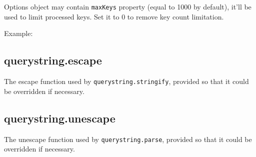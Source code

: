 Options object may contain \texttt{maxKeys} property (equal to 1000 by
default), it'll be used to limit processed keys. Set it to 0 to remove
key count limitation.

Example:

\begin{Shaded}
\begin{Highlighting}[]
\NormalTok{(}\NormalTok{)}
\NormalTok{\{ }\NormalTok{: }\NormalTok{, }\NormalTok{: [}\NormalTok{, }\NormalTok{], }\NormalTok{: } \NormalTok{\}}
\end{Highlighting}
\end{Shaded}

\subsection{querystring.escape}\label{querystring.escape}

The escape function used by \texttt{querystring.stringify}, provided so
that it could be overridden if necessary.

\subsection{querystring.unescape}\label{querystring.unescape}

The unescape function used by \texttt{querystring.parse}, provided so
that it could be overridden if necessary.
